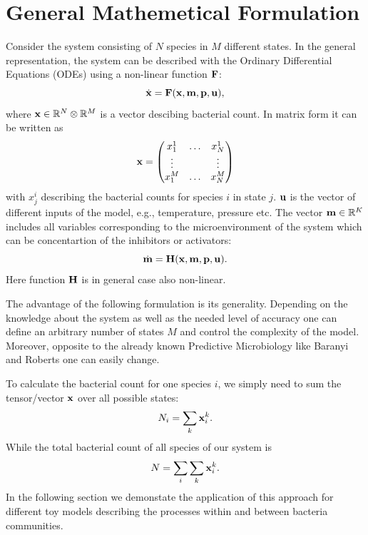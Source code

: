\documentclass[10pt,A4paper]{article}
\begin{document}
\section{General Mathemetical Formulation}
Consider the system consisting of $N$ species in $M$ different states.
In the general representation, the system can be described with the Ordinary Differential Equations (ODEs) using a non-linear function $\mathbf{F}$:
\begin{equation}
   \dot{\mathbf{x}} = \mathbf{F}(\mathbf{x}, \mathbf{m}, \mathbf{p}, \mathbf{u}),
   \label{eq:model_ODE}
\end{equation}
where  $\mathbf{x} \in \mathbb{R}^{N}  \otimes \mathbb{R}^{M}$ is a vector descibing bacterial count.
In matrix form it can be written as
\begin{equation}
    \mathbf{x} = \begin{pmatrix}
        x^1_1  & \dots & x^1_N  \\
        \vdots &       & \vdots \\
        x^M_1  & \dots & x^M_N  \\
            \end{pmatrix}
    \label{eq:model_bact}
\end{equation}
with $x_{j}^{i}$ describing the bacterial counts for species $i$ in state $j$.
$\mathbf{u}$ is the vector of different inputs of the model, e.g., temperature, pressure etc.
The vector $\mathbf{m} \in \mathbb{R}^{K}$ includes all variables corresponding to the microenvironment of the system which can be concentartion of the inhibitors or activators:
\begin{equation}
    \dot{\mathbf{m}} = \mathbf{H} (\mathbf{x}, \mathbf{m}, \mathbf{p}, \mathbf{u}).
    \label{eq:model_microenv}
\end{equation}
Here function $\mathbf{H}$ is in general case also non-linear.

The advantage of the following formulation is its generality. 
Depending on the knowledge about the system as well as the needed level of accuracy one can define an arbitrary number of states $M$ and control the complexity of the model.
Moreover, opposite to the already known Predictive Microbiology like Baranyi and Roberts one can easily change.

To calculate the bacterial count for one species $i$, we simply need to sum the tensor/vector $\mathbf{x}$ over all possible states:
\begin{equation}
    N_i = \sum_k \mathbf{x}_i^k.
\end{equation}
While the total bacterial count of all species of our system is
\begin{equation}
    N = \sum_i \sum_k \mathbf{x}_i^k.
\end{equation}
In the following section we demonstate the application of this approach for different toy models describing the processes within and between bacteria communities.
\end{document}
